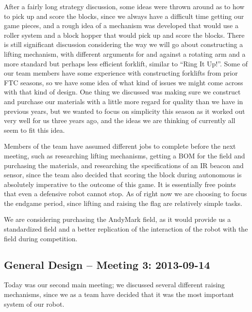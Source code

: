 \documentclass{article}
\begin{document}
After a fairly long strategy discussion, some ideas were thrown around as to how to pick up and score the blocks, since we always have a difficult time getting our game pieces, and a rough idea of a mechanism was developed that would use a roller system and a block hopper that would pick up and score the blocks. There is still significant discussion considering the way we will go about constructing a lifting mechanism, with different arguments for and against a rotating arm and a more standard but perhaps less efficient forklift, similar to ``Ring It Up!''. Some of our team members have some experience with constructing forklifts from prior FTC seasons, so we have some idea of what kind of issues we might come across with that kind of design. One thing we discussed was making sure we construct and purchase our materials with a little more regard for quality than we have in previous years, but we wanted to focus on simplicity this season as it worked out very well for us three years ago, and the ideas we are thinking of currently all seem to fit this idea.

Members of the team have assumed different jobs to complete before the next meeting, such as researching lifting mechanisms, getting a BOM for the field and purchasing the materials, and researching the specifications of an IR beacon and sensor, since the team also decided that scoring the block during autonomous is absolutely imperative to the outcome of this game. It is essentially free points that even a defensive robot cannot stop. As of right now we are choosing to focus the endgame period, since lifting and raising the flag are relatively simple tasks. 

We are considering purchasing the AndyMark field, as it would provide us a standardized field and a better replication of the interaction of the robot with the field during competition. 

\newpage \subsection{General Design -- Meeting 3: 2013-09-14}
Today was our second main meeting; we discussed several different raising mechanisms, since we as a team have decided that it was the most important system of our robot.
\end{document}
